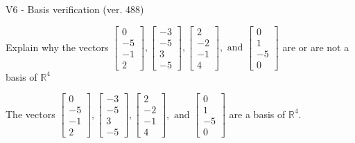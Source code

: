 \begin{exercise}
  \begin{exerciseTitle}V6 - Basis verification (ver. 488)\end{exerciseTitle}
  \begin{exerciseStatement}
    Explain why the vectors \(\left[\begin{array}{r}
0 \\
-5 \\
-1 \\
2
\end{array}\right] , \left[\begin{array}{r}
-3 \\
-5 \\
3 \\
-5
\end{array}\right] , \left[\begin{array}{r}
2 \\
-2 \\
-1 \\
4
\end{array}\right] , \text{ and } \left[\begin{array}{r}
0 \\
1 \\
-5 \\
0
\end{array}\right]\) are or are not a basis of \(\mathbb{R}^4\)	


  \end{exerciseStatement}
  \begin{exerciseAnswer}
   The vectors \(\left[\begin{array}{r}
0 \\
-5 \\
-1 \\
2
\end{array}\right] , \left[\begin{array}{r}
-3 \\
-5 \\
3 \\
-5
\end{array}\right] , \left[\begin{array}{r}
2 \\
-2 \\
-1 \\
4
\end{array}\right] , \text{ and } \left[\begin{array}{r}
0 \\
1 \\
-5 \\
0
\end{array}\right]\) 
  	 are  a basis of \(\mathbb{R}^4\).
  


  \end{exerciseAnswer}
\end{exercise}